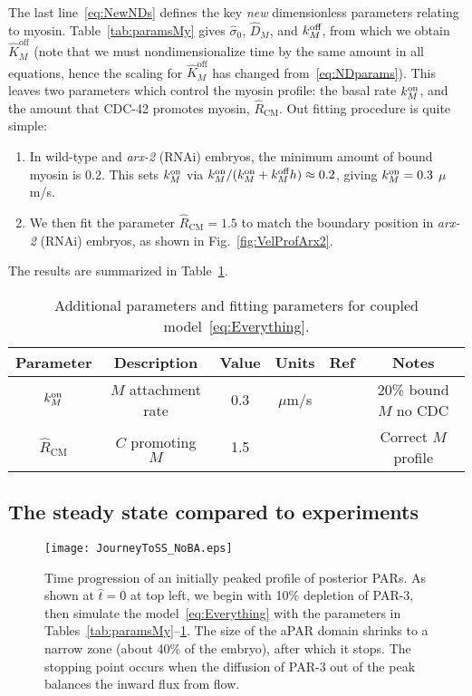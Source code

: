 \documentclass[11pt]{article}
\newcommand{\6}[1]{#1_{\text{6}}}
\newcommand{\3}[1]{#1_{\text{3}}}
\begin{document}
The last line\ \eqref{eq:NewNDs} defines the key \emph{new} dimensionless parameters relating to myosin. Table\ \ref{tab:paramsMy} gives $\hat{\sigma}_0$, $\hat D_M$, and $k^\text{off}_M$, from which we obtain $\hat K^\text{off}_M$ (note that we must nondimensionalize time by the same amount in all equations, hence the scaling for $\hat K^\text{off}_M$ has changed from\ \eqref{eq:NDparams}). This leaves two parameters which control the myosin profile: the basal rate $k^\text{on}_M$, and the amount that CDC-42 promotes myosin, $\hat R_\text{CM}$. Out fitting procedure is quite simple:
\begin{enumerate}
\item In wild-type and \emph{arx-2} (RNAi) embryos, the minimum amount of bound myosin is 0.2. This sets $k^\text{on}_M$ via $k^\text{on}_M/(k^\text{on}_M+k^\text{off}_M h) \approx 0.2$, giving $k^\text{on}_M=0.3$ $\mu$m/s.
\item We then fit the parameter $\hat R_\text{CM}=1.5$ to match the boundary position in \emph{arx-2} (RNAi) embryos, as shown in Fig.\ \ref{fig:VelProfArx2}.
\end{enumerate}
The results are summarized in Table\ \ref{tab:paramsC}.

\begin{table}
\begin{small}
\centering
\begin{tabular}{|c|c|c|c|c|c|}\hline
Parameter & Description & Value & Units & Ref & Notes \\ \hline
$k^\text{on}_M$ & $M$ attachment rate & 0.3 & $\mu$m/s & & 20\% bound $M$ no CDC \\
$\hat R_\text{CM}$ & $C$ promoting $M$ & 1.5 & &  & Correct $M$ profile\\ \hline
\end{tabular}
\caption{\label{tab:paramsC} Additional parameters and fitting parameters for coupled model\ \eqref{eq:Everything}.}
\end{small}
\end{table}


\subsection{The steady state compared to experiments}

\begin{figure}
\centering
\texttt{[image: JourneyToSS\_NoBA.eps]}
\caption{\label{fig:TimeSeqNoBA} Time progression of an initially peaked profile of posterior PARs. As shown at $\hat t=0$ at top left, we begin with 10\% depletion of PAR-3, then simulate the model\ \eqref{eq:Everything} with the parameters in Tables\ \ref{tab:paramsMy}--\ref{tab:paramsC}. The size of the aPAR domain shrinks to a narrow zone (about 40\% of the embryo), after which it stops. The stopping point occurs when the diffusion of PAR-3 out of the peak balances the inward flux from flow.}
\end{figure}
\end{document}
